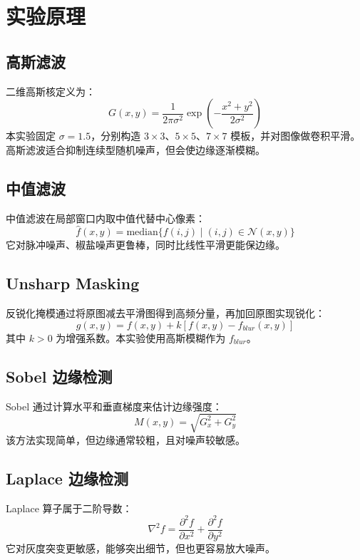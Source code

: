 \documentclass[UTF8,a4paper,12pt]{ctexart}
\begin{document}
\section{实验原理}
\subsection{高斯滤波}
二维高斯核定义为：
\begin{equation}
G(x,y)=\frac{1}{2\pi\sigma^2}\exp\left(-\frac{x^2+y^2}{2\sigma^2}\right)
\end{equation}
本实验固定 $\sigma=1.5$，分别构造 $3\times3$、$5\times5$、$7\times7$ 模板，并对图像做卷积平滑。高斯滤波适合抑制连续型随机噪声，但会使边缘逐渐模糊。

\subsection{中值滤波}
中值滤波在局部窗口内取中值代替中心像素：
\begin{equation}
\hat{f}(x,y)=\mathrm{median}\{f(i,j)\mid (i,j)\in \mathcal{N}(x,y)\}
\end{equation}
它对脉冲噪声、椒盐噪声更鲁棒，同时比线性平滑更能保边缘。

\subsection{Unsharp Masking}
反锐化掩模通过将原图减去平滑图得到高频分量，再加回原图实现锐化：
\begin{equation}
g(x,y)=f(x,y)+k\left[f(x,y)-f_{blur}(x,y)\right]
\end{equation}
其中 $k>0$ 为增强系数。本实验使用高斯模糊作为 $f_{blur}$。

\subsection{Sobel 边缘检测}
Sobel 通过计算水平和垂直梯度来估计边缘强度：
\begin{equation}
M(x,y)=\sqrt{G_x^2+G_y^2}
\end{equation}
该方法实现简单，但边缘通常较粗，且对噪声较敏感。

\subsection{Laplace 边缘检测}
Laplace 算子属于二阶导数：
\begin{equation}
\nabla^2 f=\frac{\partial^2 f}{\partial x^2}+\frac{\partial^2 f}{\partial y^2}
\end{equation}
它对灰度突变更敏感，能够突出细节，但也更容易放大噪声。
\end{document}
